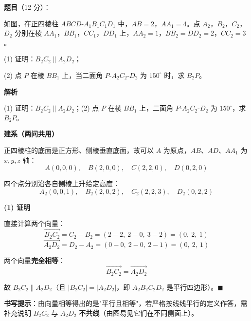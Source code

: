 \begin{answer}

\textbf{题目}（12 分）：

如图，在正四棱柱 $ABCD\text{-}A_1B_1C_1D_1$ 中，$AB=2$，$AA_1=4$。点 $A_2$，$B_2$，$C_2$，$D_2$ 分别在棱 $AA_1$，$BB_1$，$CC_1$，$DD_1$ 上，$AA_2=1$，$BB_2=DD_2=2$，$CC_2=3$。
\nopagebreak[4]
\begin{center}\end{center}
\nopagebreak[4]
  (1) 证明：$B_2C_2\parallel A_2D_2$；

  (2) 点 $P$ 在棱 $BB_1$ 上，当二面角 $P\text{-}A_2C_2\text{-}D_2$ 为 $150^\circ$ 时，求 $B_2P$。

\textbf{解析}

  (1) 证明：$B_2C_2\parallel A_2D_2$；(2) 点 $P$ 在棱 $BB_1$ 上，二面角 $P\text{-}A_2C_2\text{-}D_2$ 为 $150^\circ$，求 $B_2P$。

\par\medskip

\textbf{建系（两问共用）}

正四棱柱的底面是正方形、侧棱垂直底面，故可以 $A$ 为原点，$AB$、$AD$、$AA_1$ 为 $x,y,z$ 轴：
\nopagebreak[4]
\[A(0,0,0),\quad B(2,0,0),\quad C(2,2,0),\quad D(0,2,0)\]

四个点分别沿各自侧棱上升给定高度：
\nopagebreak[4]
\[A_2(0,0,1),\quad B_2(2,0,2),\quad C_2(2,2,3),\quad D_2(0,2,2)\]

\par\medskip

\textbf{(1) 证明}

直接计算两个向量：
\nopagebreak[4]
\[\overrightarrow{B_2C_2}=C_2-B_2=(2-2,\ 2-0,\ 3-2)=(0,\ 2,\ 1)\]
\nopagebreak[4]
\[\overrightarrow{A_2D_2}=D_2-A_2=(0-0,\ 2-0,\ 2-1)=(0,\ 2,\ 1)\]

两个向量\textbf{完全相等}：
\nopagebreak[4]
\[\overrightarrow{B_2C_2}=\overrightarrow{A_2D_2}\]

故 $B_2C_2\parallel A_2D_2$（且 $\left|B_2C_2\right|=\left|A_2D_2\right|$，即 $A_2B_2C_2D_2$ 是平行四边形）。$\blacksquare$

\begin{gktip}
\textbf{书写提示}：由向量相等得出的是"平行且相等"，若严格按线线平行的定义作答，需补充说明 $B_2C_2$ 与 $A_2D_2$ \textbf{不共线}（由图易见它们在不同侧面上）。
\end{gktip}


\end{answer}
